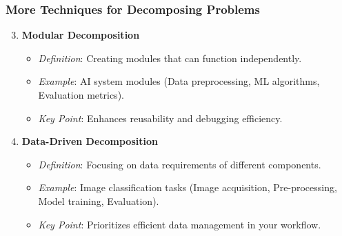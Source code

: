 \documentclass[aspectratio=169]{beamer}
\begin{document}
\begin{frame}[fragile]
    \frametitle{More Techniques for Decomposing Problems}
    \begin{enumerate}
        \setcounter{enumi}{2} %
        \item \textbf{Modular Decomposition}
            \begin{itemize}
                \item \textit{Definition}: Creating modules that can function independently.
                \item \textit{Example}: AI system modules (Data preprocessing, ML algorithms, Evaluation metrics).
                \item \textit{Key Point}: Enhances reusability and debugging efficiency.
            \end{itemize}
        \item \textbf{Data-Driven Decomposition}
            \begin{itemize}
                \item \textit{Definition}: Focusing on data requirements of different components.
                \item \textit{Example}: Image classification tasks (Image acquisition, Pre-processing, Model training, Evaluation).
                \item \textit{Key Point}: Prioritizes efficient data management in your workflow.
            \end{itemize}
    \end{enumerate}
\end{frame}
\end{document}
